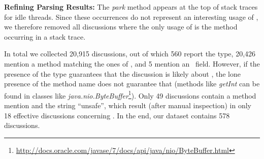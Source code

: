 



{\bf Refining Parsing Results: } The \emph{park} method appears at the top of stack traces for idle threads. Since these occurrences do not represent an interesting usage of \unsafe, we therefore removed all discussions where the only usage of \unsafe{} is the  method occurring in a stack trace.

In total we collected 20,915 discussions, out of which 560 report the type, 20,426 mention a method matching the ones of \unsafe{}, and 5 mention an \unsafe~field. However, if the presence of the type \unsafe{} guarantees that the discussion is likely about \smu, the lone presence of the method name does not guarantee that (\eg methods like \emph{getInt} can be found in classes like \emph{java.nio.ByteBuffer}\footnote{\url{http://docs.oracle.com/javase/7/docs/api/java/nio/ByteBuffer.html}}). Only 49 discussions contain a method mention and the string ``unsafe'', which result (after manual inspection) in only 18 effective discussions concerning \unsafe.
In the end, our dataset contains 578 discussions.

